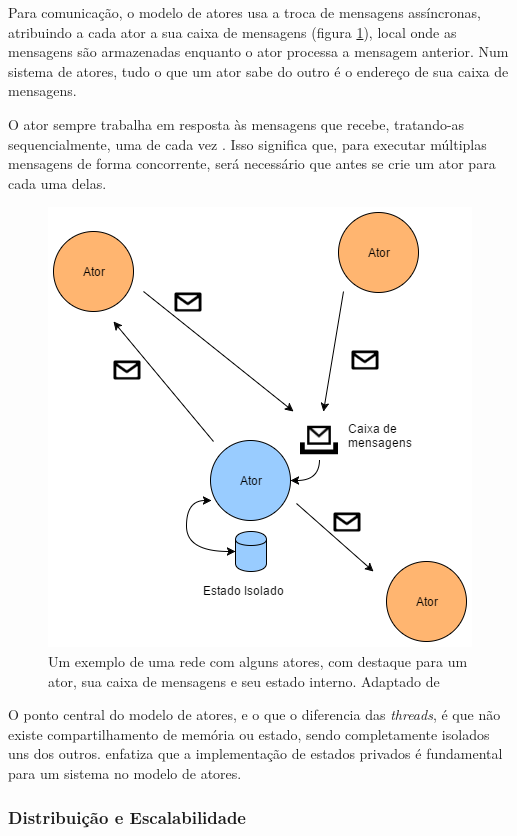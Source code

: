 Para comunicação, o modelo de atores usa a troca de mensagens assíncronas, atribuindo a cada ator a sua caixa de mensagens (figura \ref{fig:actor}), local onde as mensagens são armazenadas enquanto o ator processa a mensagem anterior. Num sistema de atores, tudo o que um ator sabe do outro é o endereço de sua caixa de mensagens.

O ator sempre trabalha em resposta às mensagens que recebe, tratando-as sequencialmente, uma de cada vez \citep{Erb2012}. Isso significa que, para executar múltiplas mensagens de forma concorrente, será necessário que antes se crie um ator para cada uma delas. 

    \begin{figure}
        \centering
        \includegraphics[width=0.9\linewidth]{fig/actor}
        \caption{Um exemplo de uma rede com alguns atores, com destaque para um ator, sua caixa de mensagens e seu estado interno. Adaptado de \citet{Erb2012}}
        \label{fig:actor}
    \end{figure}
 
O ponto central do modelo de atores, e o que o diferencia das \textit{threads}, é que não existe compartilhamento de memória ou estado, sendo completamente isolados uns dos outros. \citet{Erb2012} enfatiza que a implementação de estados privados é fundamental para um sistema no modelo de atores.

\subsubsection{Distribuição e Escalabilidade}

